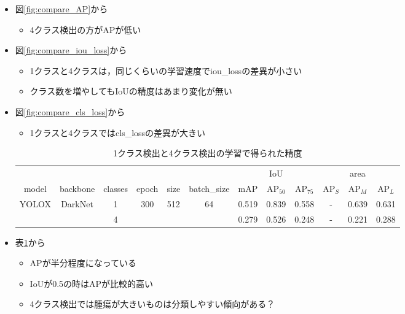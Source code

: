 \documentclass[a4j]{ujarticle}
\newcommand{\Tref}[1]{\mbox{表\ref{tab:#1}}}
\newcommand{\Fref}[1]{\mbox{図\ref{fig:#1}}}
\begin{document}
\begin{itemize}
            \item \Fref{compare_AP}から
            \begin{itemize}
                \item 4クラス検出の方がAPが低い
            \end{itemize}
            \item \Fref{compare_iou_loss}から
            \begin{itemize}
                \item 1クラスと4クラスは，同じくらいの学習速度でiou\_lossの差異が小さい
                \item クラス数を増やしてもIoUの精度はあまり変化が無い
            \end{itemize}
            \item \Fref{compare_cls_loss}から
            \begin{itemize}
                \item 1クラスと4クラスではcls\_lossの差異が大きい
            \end{itemize}

            \begin{table}[h]
                \centering
                \caption{1クラス検出と4クラス検出の学習で得られた精度}
                \label{tab:compare}
                \begin{tabular}{cccccc|ccc|ccc}
                    & & & & & & & IoU & & & area & \\
                    model & backbone & classes & epoch & size & batch\_size & mAP & AP$_{50}$ & AP$_{75}$ & AP$_S$ & AP$_M$ & AP$_L$ \\ \hline
                    \multirow{2}{*}{YOLOX\cite{yolox}} & \multirow{2}{*}{DarkNet} & 1 & \multirow{2}{*}{300} & \multirow{2}{*}{512} & \multirow{2}{*}{64} & 0.519 & 0.839 & 0.558 & - & 0.639 & 0.631 \\
                    &  & 4 &  &  &  & 0.279 & 0.526 & 0.248 & - & 0.221 & 0.288 \\
                \end{tabular}
            \end{table}

            \item \Tref{compare}から
            \begin{itemize}
                \item APが半分程度になっている
                \item IoUが0.5の時はAPが比較的高い
                \item 4クラス検出では腫瘍が大きいものは分類しやすい傾向がある？
            \end{itemize}


\end{itemize}
\end{document}

